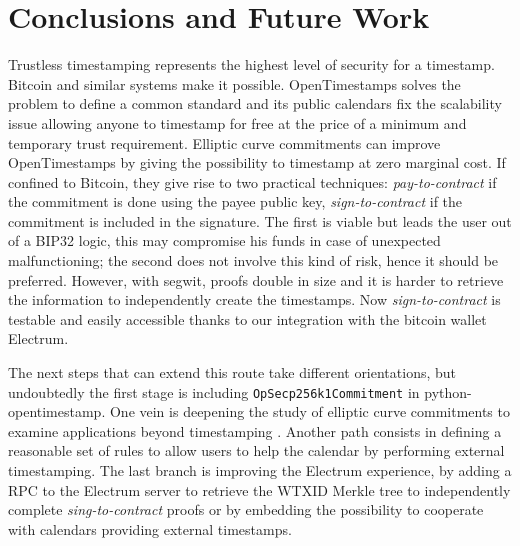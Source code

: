 \chapter{Conclusions and Future Work}
\label{chpr:conclusions}
Trustless timestamping represents the highest level of security for a timestamp. 
Bitcoin and similar systems make it possible.
OpenTimestamps solves the problem to define a common standard and its public calendars fix the scalability issue allowing anyone to timestamp for free at the price of a minimum and temporary trust requirement.
Elliptic curve commitments can improve OpenTimestamps by giving the possibility to timestamp at zero marginal cost. 
If confined to Bitcoin, they give rise to two practical techniques: \textit{pay-to-contract} if the commitment is done using the payee public key, \textit{sign-to-contract} if the commitment is included in the signature. 
The first is viable but leads the user out of a BIP32 logic, this may compromise his funds in case of unexpected malfunctioning; the second does not involve this kind of risk, hence it should be preferred. 
However, with segwit, proofs double in size and it is harder to retrieve the information to independently create the timestamps.
Now \textit{sign-to-contract} is testable and easily accessible thanks to our integration with the bitcoin wallet Electrum.

The next steps that can extend this route take different orientations, but undoubtedly the first stage is including \verb|OpSecp256k1Commitment| in python-opentimestamp.
One vein is deepening the study of elliptic curve commitments to examine applications beyond timestamping \cite{TapRoot}.
Another path consists in defining a reasonable set of rules to allow users to help the calendar by performing external timestamping.
The last branch is improving the Electrum experience, by adding a RPC to the Electrum server to retrieve the WTXID Merkle tree to independently complete \textit{sing-to-contract} proofs or by embedding the possibility to cooperate with calendars providing external timestamps.
